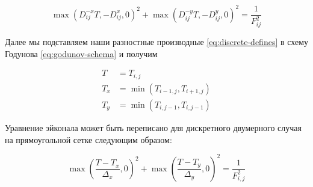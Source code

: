 \documentclass[a4paper,12pt]{article}
\begin{document}
\begin{equation}
  \label{eq:godunov-schema}
       \max (D^{-x}_{ij}T, -D^{x}_{ij},0)^2 + 
	  \max (D^{-y}_{ij}T, -D^{y}_{ij},0)^2
  = \frac{1}{F_{ij}^2}
\end{equation}







Далее мы подставляем наши разностные производные
\eqref{eq:discrete-defines} в схему Годунова \eqref{eq:godunov-schema}
и получим

\begin{equation}
  \begin{aligned}
    T &= T_{i,j}\\
    T_{x}&= \min(T_{i-1,j},T_{i+1,j})\\
    T_{y}&= \min(T_{i,j-1},T_{i,j-1})
      \end{aligned}
\end{equation}

Уравнение эйконала может быть переписано для дискретного двумерного
случая на прямоугольной сетке следующим образом:

\begin{equation}
  \label{eq:discrete-eikonal}
  \max \left( \frac {T-T_{x}}{\Delta_x},0 \right)^2+  \max \left( \frac
      {T-T_{y}}{\Delta_y},0\right)^2 = \frac{1}{F_{i,j}^2}
\end{equation}
\end{document}
